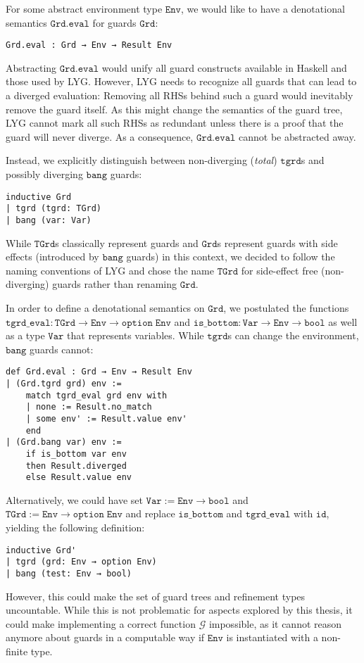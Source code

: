 For some abstract environment type $\mathtt{Env}$, we would like to have a denotational semantics $\mathtt{Grd.eval}$ for guards $\mathtt{Grd}$:
\begin{verbatim}
Grd.eval : Grd → Env → Result Env
\end{verbatim}

Abstracting $\mathtt{Grd.eval}$ would unify all guard constructs available in Haskell and those used by LYG.
However, LYG needs to recognize all guards that can lead to a diverged evaluation:
Removing all RHSs behind such a guard would inevitably remove the guard itself.
As this might change the semantics of the guard tree, LYG cannot mark all such RHSs as redundant unless there is a proof that the guard will never diverge.
As a consequence, $\mathtt{Grd.eval}$ cannot be abstracted away.

Instead, we explicitly distinguish between non-diverging (\textit{total}) $\mathtt{tgrd}$s and possibly diverging $\mathtt{bang}$ guards:
\begin{verbatim}
inductive Grd
| tgrd (tgrd: TGrd)
| bang (var: Var)
\end{verbatim}

While $\mathtt{TGrd}$s classically represent guards and $\mathtt{Grd}$s represent guards with side effects (introduced by $\mathtt{bang}$ guards) in this context,
we decided to follow the naming conventions of LYG and chose the name $\mathtt{TGrd}$ for side-effect free (non-diverging) guards
rather than renaming $\mathtt{Grd}$.

In order to define a denotational semantics on $\mathtt{Grd}$, we postulated the functions $\mathtt{tgrd\_eval}: \mathtt{TGrd} \to \mathtt{Env} \to \mathtt{option}\;\mathtt{Env}$ and $\mathtt{is\_bottom}: \mathtt{Var} \to \mathtt{Env} \to \mathtt{bool}$ as well as a type $\mathtt{Var}$ that represents variables. While $\mathtt{tgrd}$s can change the environment,
$\mathtt{bang}$ guards cannot:

\begin{verbatim}
def Grd.eval : Grd → Env → Result Env
| (Grd.tgrd grd) env :=
    match tgrd_eval grd env with
    | none := Result.no_match
    | some env' := Result.value env'
    end
| (Grd.bang var) env :=
    if is_bottom var env
    then Result.diverged
    else Result.value env
\end{verbatim}

Alternatively,
we could have set $\mathtt{Var} := \mathtt{Env} → \mathtt{bool}$ and $\mathtt{TGrd} := \mathtt{Env} → \mathtt{option}\;\mathtt{Env}$ and replace $\mathtt{is\_bottom}$ and $\mathtt{tgrd\_eval}$ with $\mathtt{id}$,
yielding the following definition:
\begin{verbatim}
inductive Grd'
| tgrd (grd: Env → option Env)
| bang (test: Env → bool)
\end{verbatim}
However, this could make the set of guard trees and refinement types uncountable.
While this is not problematic for aspects explored by this thesis,
it could make implementing a correct function $\mathcal{G}$ impossible, as it cannot reason anymore about guards in a computable way if $\mathtt{Env}$ is instantiated with a non-finite type.

